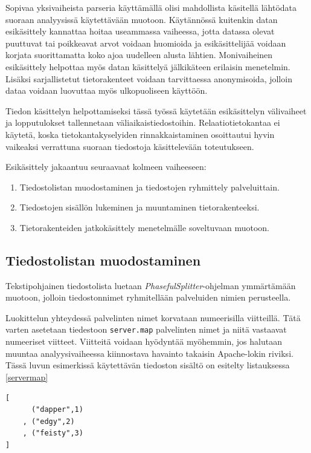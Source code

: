 Sopivaa yksivaiheista parseria käyttämällä olisi mahdollista käsitellä
lähtödata suoraan analyysissä käytettävään muotoon. Käytännössä
kuitenkin datan esikäsittely kannattaa hoitaa useammassa vaiheessa,
jotta datassa olevat puuttuvat tai poikkeavat arvot voidaan huomioida
ja esikäsittelijää voidaan korjata suorittamatta koko ajoa uudelleen
alusta lähtien. Monivaiheinen esikäsittely helpottaa myös datan
käsittelyä jälkikäteen erilaisin menetelmin. Lisäksi sarjallistetut
tietorakenteet voidaan tarvittaessa anonymisoida, jolloin dataa
voidaan luovuttaa myös ulkopuoliseen käyttöön.

Tiedon käsittelyn helpottamiseksi tässä työssä käytetään esikäsittelyn
välivaiheet ja lopputulokset tallennetaan väliaikaistiedostoihin.
Relaatiotietokantaa ei käytetä, koska tietokantakyselyiden
rinnakkaistaminen osoittautui hyvin vaikeaksi verrattuna suoraan
tiedostoja käsittelevään toteutukseen.

Esikäsittely jakaantuu seuraavaat kolmeen vaiheeseen:

\begin{enumerate}
\item Tiedostolistan muodostaminen ja tiedostojen ryhmittely palveluittain.
\item Tiedostojen sisällön lukeminen ja muuntaminen tietorakenteeksi.
\item Tietorakenteiden jatkokäsittely menetelmälle soveltuvaan muotoon.
\end{enumerate}

\subsection{Tiedostolistan muodostaminen}

Tekstipohjainen tiedostolista luetaan
\textit{PhasefulSplitter}-ohjelman ymmärtämään muotoon, jolloin
tiedostonnimet ryhmitellään palveluiden nimien perusteella. 

Luokittelun yhteydessä palvelinten nimet korvataan numeerisilla
viitteillä. Tätä varten asetetaan tiedestoon \texttt{server.map}
palvelinten nimet ja niitä vastaavat numeeriset viitteet. Viitteitä
voidaan hyödyntää myöhemmin, jos halutaan muuntaa analyysivaiheessa
kiinnostava havainto takaisin Apache-lokin riviksi. Tässä luvun
esimerkissä käytettävän tiedoston sisältö on esitelty listauksessa
\ref{servermap}

\begin{lstlisting}[language=MyHaskell,float=h,caption=Tiedoston server.map sisältö.,label=servermap,aboveskip=1cm]
[
      ("dapper",1)
    , ("edgy",2)
    , ("feisty",3)
]
\end{lstlisting}

